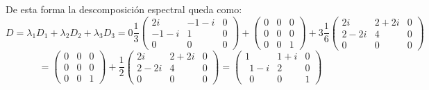 \begin{itemize}
\begin{itemize}
    \end{itemize}
    
    De esta forma la descomposición espectral queda como:\
    \[D=\lambda_1D_1+\lambda_2D_2+\lambda_3D_3=0\frac{1}{3}\begin{pmatrix}2i&-1-i&0\\-1-i&1&0\\0&0&0\end{pmatrix}+\begin{pmatrix}0&0&0\\0&0&0\\0&0&1\end{pmatrix}+3\frac{1}{6}\begin{pmatrix}2i&2+2i&0\\2-2i&4&0\\0&0&0\end{pmatrix}\]\[=\begin{pmatrix}0&0&0\\0&0&0\\0&0&1\end{pmatrix}+\frac{1}{2}\begin{pmatrix}2i&2+2i&0\\2-2i&4&0\\0&0&0\end{pmatrix}=\begin{pmatrix}1&1+i&0\\ \:\:1-i&2&0\\ \:\:0&0&1\end{pmatrix}\]
\end{itemize}